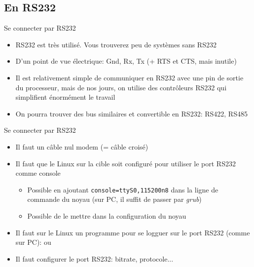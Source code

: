 \subsection{En RS232}

\begin{frame}{Se connecter par RS232}
  \begin{itemize}
  \item RS232  est très utilisé.  Vous trouverez peu de  systèmes sans
    RS232
  \item D'un point de vue électrique:  Gnd, Rx, Tx (+ RTS et CTS, mais
    inutile)
  \item Il  est relativement simple  de communiquer en RS232  avec une
    pin  de sortie du  processeur, mais  de nos  jours, on  utilise des
    contrôleurs RS232 qui simplifient énormément le travail
  \item On pourra trouver des  bus similaires et convertible en RS232:
    RS422, RS485
  \end{itemize}
\end{frame}

\begin{frame}{Se connecter par RS232}
  \begin{itemize}
  \item Il faut un câble nul modem (= câble croisé)
  \item Il faut que le Linux sur la cible soit configuré pour utiliser
    le port RS232 comme console
    \begin{itemize}
    \item Possible en ajoutant \texttt{console=ttyS0,115200n8} dans la
      ligne  de commande du  noyau (sur  PC, il  suffit de  passer par
      \emph{grub}) 
    \item Possible de le mettre dans la configuration du noyau
    \end{itemize}
  \item Il faut sur le Linux  un programme pour se logguer sur le port
    RS232 (comme sur PC):  ou 
  \item Il faut configurer le port RS232: bitrate, protocole...
  \end{itemize}
\end{frame}

